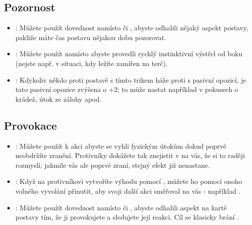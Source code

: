 \documentclass[../main.tex]{subfiles}
\begin{document}
\subsection{Pozornost}
\label{sec:trik-pozornost}
\begin{itemize}

\item{}:
\label{sec:pozornost-ctenar}
Můžete použít dovednost  namísto  či , abyste odhalili nějaký aspekt postavy, pakliže máte čas postavu nějakou dobu pozorovat.

\item{}:
\label{sec:pozornost-strelba}
Můžete použít  namísto  abyste provedli rychlý instinktivní výstřel od boku (nejste např. v situaci, kdy ležíte zamířen na terč).

\item{}:
\label{sec:pozornost-smysl}
Kdykoliv někdo proti postavě s tímto trikem háže proti  s pasivní opozicí, je tato pasivní opozice zvýšena o +2; to může nastat například v pokusech o krádež, útok ze zálohy apod.
\end{itemize}




\subsection{Provokace}
\label{sec:trik-provokace}
\begin{itemize}
  
\item{}:
\label{sec:provokace-zbroj}
Můžete použít  k akci  abyste se vyhli fyzickým útokům dokud poprvé neobdržíte zranění. Protivníky dokážete tak znejistit v  na vás, že si to raději rozmyslí; jakmile vás ale poprvé zraní, stejný efekt již nenastane.

\item{}:
\label{sec:provokace-cos}
Když na protivníkovi vytvoříte výhodu pomocí , můžete ho pomocí onoho volného vyvolání přinutit, aby svoji další akci směřoval na vás - například .

\item{}:
\label{sec:provokace-stourani}
Můžete použít dovednost  namísto  či , abyste odhalili aspekt na kartě postavy tím, že ji provokujete a sledujete její reakci. Cíl se klasicky brání .
\end{itemize}
\end{document}
